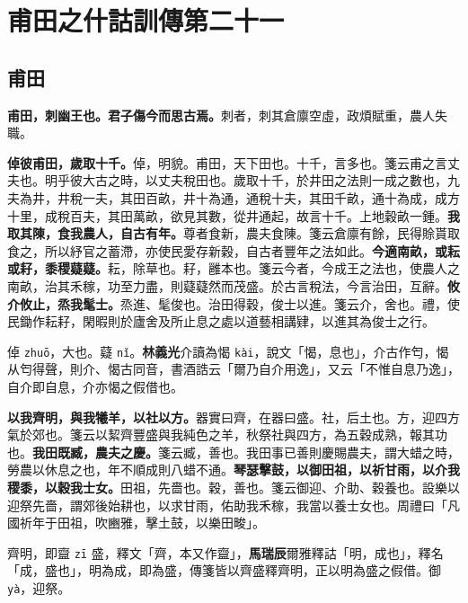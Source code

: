 \chapter{甫田之什詁訓傳第二十一}

\section{甫田}


\textbf{甫田，刺幽王也。君子傷今而思古焉。}{\footnotesize 刺者，刺其倉廪空虛，政煩賦重，農人失職。}

\textbf{倬彼甫田，歲取十千。}{\footnotesize 倬，明貌。甫田，天下田也。十千，言多也。箋云甫之言丈夫也。明乎彼大古之時，以丈夫稅田也。歲取十千，於井田之法則一成之數也，九夫為井，井稅一夫，其田百畝，井十為通，通稅十夫，其田千畝，通十為成，成方十里，成稅百夫，其田萬畝，欲見其數，從井通起，故言十千。上地穀畝一鍾。}\textbf{我取其陳，食我農人，自古有年。}{\footnotesize 尊者食新，農夫食陳。箋云倉廪有餘，民得賒貰取食之，所以紓官之蓄滯，亦使民愛存新穀，自古者豐年之法如此。}\textbf{今適南畝，或耘或耔，黍稷薿薿。}{\footnotesize 耘，除草也。耔，雝本也。箋云今者，今成王之法也，使農人之南畝，治其禾稼，功至力盡，則薿薿然而茂盛。於古言稅法，今言治田，互辭。}\textbf{攸介攸止，烝我髦士。}{\footnotesize 烝進、髦俊也。治田得穀，俊士以進。箋云介，舍也。禮，使民鋤作耘耔，閑暇則於廬舍及所止息之處以道藝相講肄，以進其為俊士之行。}

\begin{quoting}倬 \texttt{zhuō}，大也。薿 \texttt{nǐ}。\textbf{林義光}介讀為愒 \texttt{kài}，說文「愒，息也」，介古作匄，愒从匄得聲，則介、愒古同音，書酒誥云「爾乃自介用逸」，又云「不惟自息乃逸」，自介即自息，介亦愒之假借也。\end{quoting}

\textbf{以我齊明，與我犧羊，以社以方。}{\footnotesize 器實曰齊，在器曰盛。社，后土也。方，迎四方氣於郊也。箋云以絜齊豐盛與我純色之羊，秋祭社與四方，為五穀成熟，報其功也。}\textbf{我田既臧，農夫之慶。}{\footnotesize 箋云臧，善也。我田事已善則慶賜農夫，謂大蜡之時，勞農以休息之也，年不順成則八蜡不通。}\textbf{琴瑟擊鼓，以御田祖，以祈甘雨，以介我稷黍，以穀我士女。}{\footnotesize 田祖，先嗇也。穀，善也。箋云御迎、介助、穀養也。設樂以迎祭先嗇，謂郊後始耕也，以求甘雨，佑助我禾稼，我當以養士女也。周禮曰「凡國祈年于田祖，吹豳雅，擊土鼓，以樂田畯」。}

\begin{quoting}齊明，即齍 \texttt{zī} 盛，釋文「齊，本又作齍」，\textbf{馬瑞辰}爾雅釋詁「明，成也」，釋名「成，盛也」，明為成，即為盛，傳箋皆以齊盛釋齊明，正以明為盛之假借。御 \texttt{yà}，迎祭。\end{quoting}


